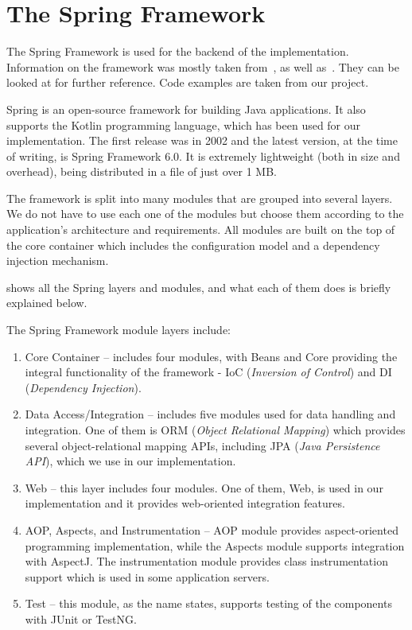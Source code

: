\section{The Spring Framework}\label{sec:spring-framework}
The Spring Framework is used for the backend of the implementation. Information on the
framework was mostly taken from~\citep{springframework, johnson2004spring}, as well as~\citep{walls2022spring}. They can be looked at for
further reference. Code examples are taken from our project.

Spring is an open-source framework for building Java applications. It also supports the Kotlin programming language, which has been used for our
implementation. The first release was in 2002 and the latest version, at the time of writing, is Spring Framework 6.0. It is extremely
lightweight (both in size and overhead), being distributed in a file of just over 1 MB\@.

The framework is split into many modules that are grouped into several layers. We do not have to use each one of the modules but choose them
according to the application's architecture and requirements. All modules are built on the top of the core container which includes the
configuration model and a dependency injection mechanism.

 shows all the Spring layers and modules, and what each of them does is briefly explained below.

The Spring Framework module layers include:

\begin{enumerate}
    \item Core Container -- includes four modules, with Beans and Core providing the integral functionality of the framework -
            IoC (\emph{Inversion of Control}) and DI (\emph{Dependency Injection}).
    \item Data Access/Integration -- includes five modules used for data handling and integration. One of them is ORM (\emph{Object Relational
            Mapping}) which provides several object-relational mapping APIs, including JPA (\emph{Java Persistence API}), which we use in our
            implementation.
    \item Web -- this layer includes four modules. One of them, Web, is used in our implementation and it provides web-oriented integration
            features.
    \item AOP, Aspects, and Instrumentation -- AOP module provides aspect-oriented programming implementation, while the Aspects module
            supports integration with AspectJ. The instrumentation module provides class instrumentation support which is used in some
            application servers.
    \item Test -- this module, as the name states, supports testing of the components with JUnit or TestNG\@.
\end{enumerate}

